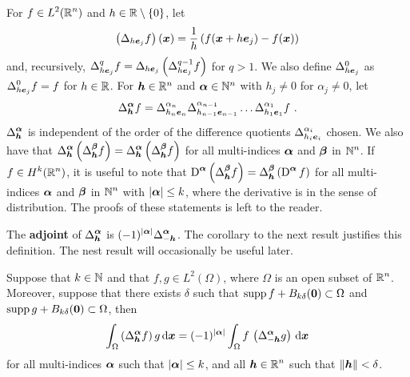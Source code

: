 For $\displaystyle f\in L^2(\mathbb{R}^n)$ and $h \in \mathbb{R}\setminus \{0\}$, let
\begin{equation}  \label{ell_diffQuot}
\left(\Delta_{h{\bm{e}}_j} f\right)({\bm{x}}) =
\frac{1}{h} \left( f({\bm{x}} + h{\bm{e}}_j) -f({\bm{x}}) \right)
\end{equation}
and, recursively,
$\displaystyle \Delta_{h{\bm{e}}_j}^q f =
\Delta_{h{\bm{e}}_j} \left(\Delta_{h{\bm{e}}_j}^{q-1} f \right)$
for $q>1$.
We also define $\Delta^0_{h{\bm{e}}_j}$ as
$\displaystyle \Delta^0_{h{\bm{e}}_j} f = f$ for $h \in \mathbb{R}$.
For ${\bm{h}} \in \mathbb{R}^n$ and ${\bm{\alpha}} \in \mathbb{N}^n$ with $h_j \neq 0$ for
$\alpha_j \neq 0$, let
\[
\Delta_{{\bm{h}}}^{{\bm{\alpha}}} f = \Delta_{h_n{\bm{e}}_n}^{\alpha_n} 
\Delta_{h_{n-1}{\bm{e}}_{n-1}}^{\alpha_{n-1}} \ldots
\Delta_{h_1{\bm{e}}_1}^{\alpha_1} f \ .
\]
$\displaystyle \Delta_{{\bm{h}}}^{{\bm{\alpha}}}$ is independent of the
order of the difference quotients
$\displaystyle \Delta_{h_i{\bm{e}}_i}^{\alpha_i}$ chosen.
We also have that
$\displaystyle \Delta_{{\bm{h}}}^{{\bm{\alpha}}}
\left( \Delta_{{\bm{h}}}^{{\bm{\beta}}} f\right)
= \Delta_{{\bm{h}}}^{{\bm{\alpha}}} \left( \Delta_{{\bm{h}}}^{{\bm{\beta}}} f\right)$
for all multi-indices ${\bm{\alpha}}$ and ${\bm{\beta}}$ in $\displaystyle \mathbb{N}^n$.
If $\displaystyle f \in H^k(\mathbb{R}^n)$, it is useful to note that
$\displaystyle \operatorname{D}^{{\bm{\alpha}}}\left( \Delta_{{\bm{h}}}^{{\bm{\beta}}} f \right)
= \Delta_{{\bm{h}}}^{{\bm{\beta}}} \left(\operatorname{D}^{{\bm{\alpha}}} f \right)$ for all
multi-indices ${\bm{\alpha}}$ and ${\bm{\beta}}$ in $\displaystyle \mathbb{N}^n$ with
$|{\bm{\alpha}}|\leq k$, where the
derivative is in the sense of distribution.  The proofs of these
statements is left to the reader.

The {\bfseries adjoint} of $\displaystyle \Delta_{{\bm{h}}}^{{\bm{\alpha}}}$ is
$\displaystyle (-1)^{|{\bm{\alpha}}|}\Delta_{-{\bm{h}}}^{{\bm{\alpha}}}$.  The
corollary to the next result justifies this definition.  The nest
result will occasionally be useful later.

\begin{prop} \label{DiffQuotientAdjoint}
Suppose that $k \in \mathbb{N}$ and that $\displaystyle f,g \in L^2(\Omega)$,
where $\Omega$ is an open subset of $\displaystyle \mathbb{R}^n$.  Moreover,
suppose that there exists $\delta$ such that
$\operatorname{supp} f + B_{k\delta}({\bm{0}}) \subset \Omega$ and
$\operatorname{supp} g + B_{k\delta}({\bm{0}}) \subset \Omega$, then
\[
\int_{\Omega} \left(\Delta^{{\bm{\alpha}}}_{{\bm{h}}} f\right) g \,\mathrm{d}{{\bm{x}}}
= (-1)^{|{\bm{\alpha}}|}
\int_{\Omega} f\,\left(\Delta^{{\bm{\alpha}}}_{-{\bm{h}}} g\right) \,\mathrm{d}{{\bm{x}}}
\]
for all multi-indices ${\bm{\alpha}}$ such that $|{\bm{\alpha}}|\leq k$, and all
$\displaystyle {\bm{h}} \in \mathbb{R}^n$ such that $\|{\bm{h}}\|<\delta$.
\end{prop}

